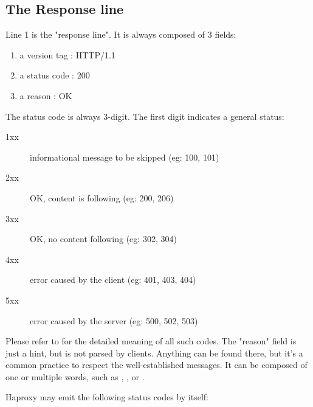 \subsection{The Response line}
\label{subsec:response_line}

Line 1 is the "response line". It is always composed of 3 fields:

\begin{enumerate}
\item a version tag : HTTP/1.1
\item a status code : 200
\item a reason      : OK
\end{enumerate}

The status code is always 3-digit. The first digit indicates a general status:

\begin{description}
\item[1xx] informational message to be skipped (eg: 100, 101)
\item[2xx] OK, content is following   (eg: 200, 206)
\item[3xx] OK, no content following   (eg: 302, 304)
\item[4xx] error caused by the client (eg: 401, 403, 404)
\item[5xx] error caused by the server (eg: 500, 502, 503)
\end{description}

Please refer to  for the detailed meaning of all such codes. The
"reason" field is just a hint, but is not parsed by clients. Anything can be
found there, but it's a common practice to respect the well-established
messages. It can be composed of one or multiple words, such as , ,
or .

Haproxy may emit the following status codes by itself:

